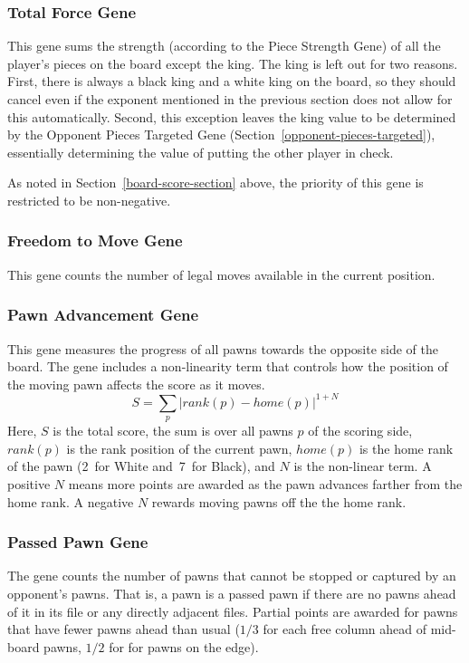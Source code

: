\documentclass[letterpaper]{article}
\renewcommand{\_}{\allowbreak\textunderscore\allowbreak}
\begin{document}
\subsubsection{Total Force Gene}\label{total-force}
This gene sums the strength (according to the Piece Strength Gene) of all the player's pieces on the board except the king. The king is left out for two reasons. First, there is always a black king and a white king on the board, so they should cancel even if the exponent mentioned in the previous section does not allow for this automatically. Second, this exception leaves the king value to be determined by the Opponent Pieces Targeted Gene (Section~\ref{opponent-pieces-targeted}), essentially determining the value of putting the other player in check.

As noted in Section~\ref{board-score-section} above, the priority of this gene is restricted to be non-negative.

\subsubsection{Freedom to Move Gene}
This gene counts the number of legal moves available in the current position.

\subsubsection{Pawn Advancement Gene}
This gene measures the progress of all pawns towards the opposite side of the board. The gene includes a non-linearity term that controls how the position of the moving pawn affects the score as it moves.
\[S = \sum_p \left|rank(p) - home(p)\right|^{1 + N}\]
Here, \(S\) is the total score, the sum is over all pawns \(p\) of the scoring side, \(rank(p)\) is the rank position of the current pawn, \(home(p)\) is the home rank of the pawn (2~for White and~7~for Black), and \(N\) is the non-linear term. A positive \(N\) means more points are awarded as the pawn advances farther from the home rank. A negative \(N\) rewards moving pawns off the the home rank.

\subsubsection{Passed Pawn Gene}
The gene counts the number of pawns that cannot be stopped or captured by an opponent's pawns. That is, a pawn is a passed pawn if there are no pawns ahead of it in its file or any directly adjacent files. Partial points are awarded for pawns that have fewer pawns ahead than usual (\(1/3\) for each free column ahead of mid-board pawns, \(1/2\) for for pawns on the edge).
\end{document}
